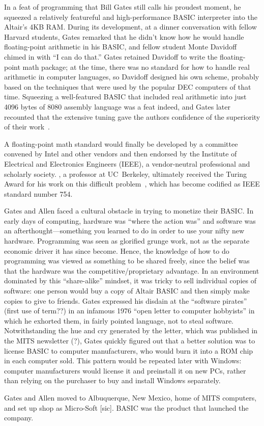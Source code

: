 In a feat of programming that Bill Gates
still calls his proudest moment, he squeezed a relatively featureful
and high-performance BASIC interpreter into the Altair's 4KB RAM.  
During its development, at a dinner
conversation with fellow Harvard students, Gates remarked that he didn't
know how he would handle floating-point arithmetic in his BASIC, and
fellow student Monte Davidoff chimed in with ``I can do that.''
Gates retained
Davidoff to write the floating-point math package; at the time, there
was no standard for how to handle real arithmetic in 
computer languages, so Davidoff designed his own scheme, probably based
on the techniques that were used by the popular DEC computers of that time.
Squeezing a well-featured BASIC that included real arithmetic into just
4096 bytes of 8080 assembly language was a feat indeed, and Gates later
recounted that the extensive tuning
gave the authors confidence of the superiority of their
work~\cite{programmers_at_work}.  

  \begin{geeknote}
  A floating-point math standard would finally be developed by a
  committee convened by Intel 
  and other vendors and then endorsed by the Institute of Electrical and
  Electronics Engineers (IEEE), a vendor-neutral professional and scholarly
  society.  , a professor at UC~Berkeley, ultimately
  received the 
  Turing Award for his work on this difficult
  problem~\cite{kahan_interview}, which has become codified as IEEE
  standard number 754.
  \end{geeknote}

Gates and Allen faced a cultural obstacle in trying to monetize their
BASIC.  
In early days of computing, hardware was  ``where the action
was'' and software was an afterthought---something you learned to
do in order to use your nifty new hardware.
Programming was seen as glorified grunge work, not as the separate
economic driver it has since become.
Hence, the knowledge of how to do programming was viewed as something to be
shared freely, since the belief was that the hardware was the
competitive/proprietary advantage.
In an environment dominated by this
``share-alike'' mindset, it was
tricky to sell individual copies of software: one person would buy a
copy of Altair BASIC and then simply make copies to give to friends.
Gates
expressed his disdain at the ``software pirates'' (first use of term??)
in an infamous 
1976 ``open letter to computer hobbyists'' in which he exhorted them, in
fairly pointed language, not to steal
software.  Notwithstanding the hue and cry generated by the letter,
which was published in the MITS newsletter (?), 
Gates quickly figured out that a better solution was to license BASIC to
computer manufacturers, who would burn it into a ROM chip in each computer
sold.  This pattern would be repeated later with Windows: computer
manufacturers would license it and  preinstall it on new PCs,  rather
than relying on the purchaser to buy and install Windows separately.

Gates and Allen moved to Albuquerque, New Mexico, home of MITS
computers, and set up shop as Micro-Soft [sic].  BASIC was the product
that launched the company.
